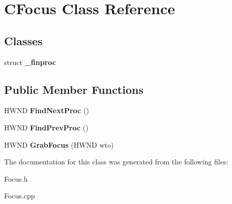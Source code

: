 \hypertarget{class_c_focus}{\section{C\-Focus Class Reference}
\label{class_c_focus}
}
\subsection*{Classes}
\begin{DoxyCompactItemize}
\item 
struct {\bfseries \-\_\-finproc}
\end{DoxyCompactItemize}
\subsection*{Public Member Functions}
\begin{DoxyCompactItemize}
\item 
\hypertarget{class_c_focus_a2c42ba1e36ed674abc13211ebc561c92}{H\-W\-N\-D {\bfseries Find\-Next\-Proc} ()}\label{class_c_focus_a2c42ba1e36ed674abc13211ebc561c92}

\item 
\hypertarget{class_c_focus_a6667261f1c2b8e80b5529dcfcc2cf21e}{H\-W\-N\-D {\bfseries Find\-Prev\-Proc} ()}\label{class_c_focus_a6667261f1c2b8e80b5529dcfcc2cf21e}

\item 
\hypertarget{class_c_focus_a5d3a50420248256b5de6cb0277def6be}{H\-W\-N\-D {\bfseries Grab\-Focus} (H\-W\-N\-D wto)}\label{class_c_focus_a5d3a50420248256b5de6cb0277def6be}

\end{DoxyCompactItemize}


The documentation for this class was generated from the following files\-:\begin{DoxyCompactItemize}
\item 
Focus.\-h\item 
Focus.\-cpp\end{DoxyCompactItemize}
